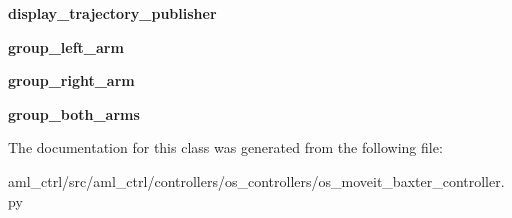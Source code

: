 \begin{DoxyCompactItemize}
{\bfseries display\+\_\+trajectory\+\_\+publisher}
\item 
\hypertarget{classaml__ctrl_1_1controllers_1_1os__controllers_1_1os__moveit__baxter__controller_1_1_baxter_move_it_controller_a6750fdc448f782cfbd3bf1859c8e2503}{}\label{classaml__ctrl_1_1controllers_1_1os__controllers_1_1os__moveit__baxter__controller_1_1_baxter_move_it_controller_a6750fdc448f782cfbd3bf1859c8e2503} 
{\bfseries group\+\_\+left\+\_\+arm}
\item 
\hypertarget{classaml__ctrl_1_1controllers_1_1os__controllers_1_1os__moveit__baxter__controller_1_1_baxter_move_it_controller_afbc743ae405edc5f8974c7b89732aaa7}{}\label{classaml__ctrl_1_1controllers_1_1os__controllers_1_1os__moveit__baxter__controller_1_1_baxter_move_it_controller_afbc743ae405edc5f8974c7b89732aaa7} 
{\bfseries group\+\_\+right\+\_\+arm}
\item 
\hypertarget{classaml__ctrl_1_1controllers_1_1os__controllers_1_1os__moveit__baxter__controller_1_1_baxter_move_it_controller_a8fa5f00622d9497afe8d8df91a0bbe9f}{}\label{classaml__ctrl_1_1controllers_1_1os__controllers_1_1os__moveit__baxter__controller_1_1_baxter_move_it_controller_a8fa5f00622d9497afe8d8df91a0bbe9f} 
{\bfseries group\+\_\+both\+\_\+arms}
\end{DoxyCompactItemize}


The documentation for this class was generated from the following file\+:\begin{DoxyCompactItemize}
\item 
aml\+\_\+ctrl/src/aml\+\_\+ctrl/controllers/os\+\_\+controllers/os\+\_\+moveit\+\_\+baxter\+\_\+controller.\+py\end{DoxyCompactItemize}
